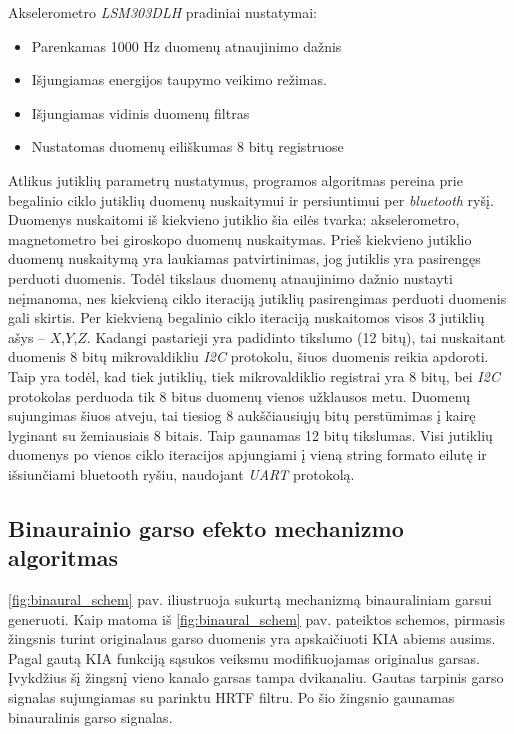 \documentclass[]{vgtuef}
\begin{document}
Akselerometro \textit{LSM303DLH} pradiniai nustatymai:
\begin{itemize}
\item Parenkamas 1000 Hz duomenų atnaujinimo dažnis
\item Išjungiamas energijos taupymo veikimo režimas.
\item Išjungiamas vidinis duomenų filtras 
\item Nustatomas duomenų eiliškumas 8 bitų registruose
\end{itemize}

Atlikus jutiklių parametrų nustatymus, programos algoritmas pereina prie begalinio ciklo jutiklių duomenų nuskaitymui ir persiuntimui per \textit{bluetooth} ryšį. Duomenys nuskaitomi iš kiekvieno jutiklio šia eilės tvarka: akselerometro, magnetometro bei giroskopo duomenų nuskaitymas. Prieš kiekvieno jutiklio duomenų nuskaitymą yra laukiamas patvirtinimas, jog jutiklis yra pasirengęs perduoti duomenis. Todėl tikslaus duomenų atnaujinimo dažnio nustayti neįmanoma, nes kiekvieną ciklo iteraciją jutiklių pasirengimas perduoti duomenis gali skirtis. Per kiekvieną begalinio ciklo iteraciją nuskaitomos visos 3 jutiklių ašys – $X$,$Y$,$Z$. Kadangi pastarieji yra padidinto tikslumo (12 bitų), tai nuskaitant duomenis 8 bitų mikrovaldikliu \textit{I2C} protokolu, šiuos duomenis reikia apdoroti. Taip yra todėl, kad tiek jutiklių, tiek mikrovaldiklio registrai yra 8 bitų, bei \textit{I2C} protokolas perduoda tik 8 bitus duomenų vienos užklausos metu. Duomenų sujungimas šiuos atveju, tai tiesiog 8 aukščiausiųjų bitų perstūmimas į kairę lyginant su žemiausiais 8 bitais. Taip gaunamas 12 bitų tikslumas. Visi jutiklių duomenys po vienos ciklo iteracijos apjungiami į vieną string formato eilutę ir išsiunčiami bluetooth ryšiu, naudojant \textit{UART} protokolą.

\subsection{Binaurainio garso efekto mechanizmo algoritmas}

\ref{fig:binaural_schem} pav. iliustruoja sukurtą mechanizmą binauraliniam garsui generuoti. Kaip matoma iš \ref{fig:binaural_schem} pav. pateiktos schemos, pirmasis žingsnis turint originalaus garso duomenis yra apskaičiuoti KIA abiems ausims. Pagal gautą KIA funkciją sąsukos veiksmu modifikuojamas originalus garsas. Įvykdžius šį žingsnį vieno kanalo garsas tampa dvikanaliu. Gautas tarpinis garso signalas sujungiamas su parinktu HRTF filtru. Po šio žingsnio gaunamas binauralinis garso signalas.
\end{document}
